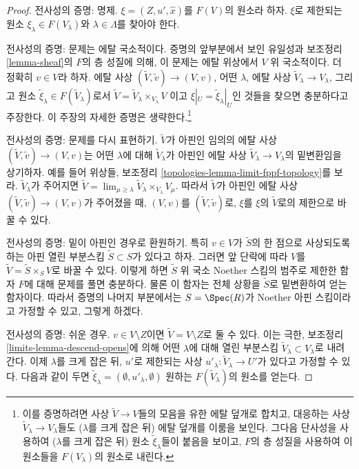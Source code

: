 \begin{proof}
\medskip\noindent
전사성의 증명: 명제.
$\xi = (Z, u', \hat x)$를 $F(V)$의 원소라 하자.
$\xi$로 제한되는 원소 $\xi_\lambda \in F(V_\lambda)$와
$\lambda \in \Lambda$를 찾아야 한다.

\medskip\noindent
전사성의 증명: 문제는 에탈 국소적이다.
증명의 앞부분에서 보인 유일성과 보조정리 \ref{lemma-sheaf}의
$F$의 층 성질에 의해, 이 문제는 에탈 위상에서 $V$ 위 국소적이다.
더 정확히 $v \in V$라 하자. 에탈 사상
$(\tilde V, \tilde v) \to (V, v)$, 어떤 $\lambda$,
에탈 사상 $\tilde V_\lambda \to V_\lambda$,
그리고 원소 $\tilde \xi_\lambda \in F(\tilde V_\lambda)$로서
$\tilde V = \tilde V_\lambda \times_{V_\lambda} V$
이고 $\xi|_U = \tilde \xi_\lambda|_U$인 것들을 찾으면 충분하다고 주장한다.
이 주장의 자세한 증명은 생략한다.\footnote{이를 증명하려면
사상 $\tilde V \to V$들의 모음을 유한 에탈 덮개로 합치고,
대응하는 사상 $\tilde V_\lambda \to V_\lambda$들도
($\lambda$를 크게 잡은 뒤) 에탈 덮개를 이룸을 보인다.
그다음 단사성을 사용하여 ($\lambda$를 크게 잡은 뒤)
원소 $\tilde \xi_\lambda$들이 붙음을 보이고, $F$의 층 성질을 사용하여
이 원소들을 $F(V_\lambda)$의 원소로 내린다.}

\medskip\noindent
전사성의 증명: 문제를 다시 표현하기.
$\tilde V$가 아핀인 임의의 에탈 사상
$(\tilde V, \tilde v) \to (V, v)$는 어떤 $\lambda$에 대해
$\tilde V_\lambda$가 아핀인 에탈 사상
$\tilde V_\lambda \to V_\lambda$의 밑변환임을 상기하자.
예를 들어 위상들, 보조정리
\ref{topologies-lemma-limit-fppf-topology}를 보라.
$\tilde V_\lambda$가 주어지면
$\tilde V = \lim_{\mu \geq \lambda} \tilde V_\lambda \times_{V_\lambda} V_\mu$.
따라서 $\tilde V$가 아핀인 에탈 사상
$(\tilde V, \tilde v) \to (V, v)$가 주어졌을 때,
$(V, v)$를 $(\tilde V, \tilde v)$로, $\xi$를 $\xi$의
$\tilde V$로의 제한으로 바꿀 수 있다.

\medskip\noindent
전사성의 증명: 밑이 아핀인 경우로 환원하기.
특히 $v \in V$가 $\tilde S$의 한 점으로 사상되도록 하는
아핀 열린 부분스킴 $\tilde S \subset S$가 있다고 하자.
그러면 앞 단락에 따라
$V$를 $\tilde V = \tilde S \times_S V$로 바꿀 수 있다.
이렇게 하면 $\tilde S$ 위 국소 Noether 스킴의 범주로 제한한
함자 $F$에 대해 문제를 풀면 충분하다. 물론 이 함자는 전체 상황을
$\tilde S$로 밑변환하여 얻는 함자이다. 따라서 증명의 나머지 부분에서는
$S = \Spec(R)$가 Noether 아핀 스킴이라고 가정할 수 있고, 그렇게 하겠다.

\medskip\noindent
전사성의 증명: 쉬운 경우.
$v \in V \setminus Z$이면 $\tilde V = V \setminus Z$로 둘 수 있다.
이는 극한, 보조정리 \ref{limits-lemma-descend-opens}에 의해
어떤 $\lambda$에 대해 열린 부분스킴
$\tilde V_\lambda \subset V_\lambda$로 내려간다.
이제 $\lambda$를 크게 잡은 뒤, $u'$로 제한되는 사상
$u'_\lambda : \tilde V_\lambda \to U'$가 있다고 가정할 수 있다.
다음과 같이 두면
$\tilde \xi_\lambda = (\emptyset, u'_\lambda, \emptyset)$
원하는 $F(\tilde V_\lambda)$의 원소를 얻는다.


\end{proof}
